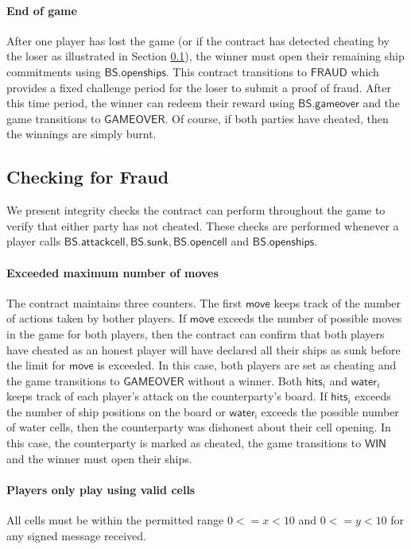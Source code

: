 \documentclass{llncs}
\newcommand{\gamewinner}{\mathsf{WIN}}
\newcommand{\gamefraud}{\mathsf{FRAUD}}
\newcommand{\gamefinished}{\mathsf{GAMEOVER}}
\newcommand{\battleshipattackcell}{\mathsf{BS.attackcell}}
\newcommand{\battleshiprevealcell}{\mathsf{BS.opencell}}
\newcommand{\battleshipsinking}{\mathsf{BS.sunk}}
\newcommand{\battleshiprevealships}{\mathsf{BS.openships}}
\newcommand{\battleshipgameover}{\mathsf{BS.gameover}}
\begin{document}
\paragraph{End of game} 
After one player has lost the game (or if the contract has detected cheating by the loser as illustrated in Section \ref{sec:fraud}), the winner must open their remaining ship commitments using $\battleshiprevealships$.
This contract transitions to $\gamefraud$ which provides a fixed challenge period for the loser to submit a proof of fraud. 
After this time period, the winner can redeem their reward using $\battleshipgameover$  and the game  transitions to $\gamefinished$. 
Of course, if both parties have cheated, then the winnings are simply burnt. 

\subsection{Checking for Fraud} \label{sec:fraud}

We present integrity checks the contract can perform throughout the game to verify that either party has not cheated. 
These checks are performed whenever a player calls $\battleshipattackcell, \battleshipsinking, \battleshiprevealcell$ and $\battleshiprevealships$.


\paragraph{Exceeded maximum number of moves} 
The contract maintains three counters.
The first $\mathsf{move}$ keeps track of the number of actions taken by bother players.
If $\mathsf{move}$ exceeds the number of possible moves in the game for both players, then the contract can confirm that both players have cheated as an honest player will have declared all their ships as sunk before the limit for $\mathsf{move}$ is exceeded.
In this case, both players are set as cheating and the game transitions to $\gamefinished$ without a winner. 
Both $\mathsf{hits}_{i}$ and $\mathsf{water}_{i}$ keeps track of each player's attack on the counterparty's board. 
If $\mathsf{hits}_{i}$ exceeds the number of ship positions on the board or $\mathsf{water_{i}}$ exceeds the possible number of water cells, then the counterparty was dishonest about their cell opening. 
In this case, the counterparty is marked as cheated, the game transitions to $\gamewinner$ and the winner must open their ships.  

\paragraph{Players only play using valid cells}  
All cells must be within the permitted range $0 <= x < 10$ and $0 <= y < 10$ for any signed message received. 
\end{document}
